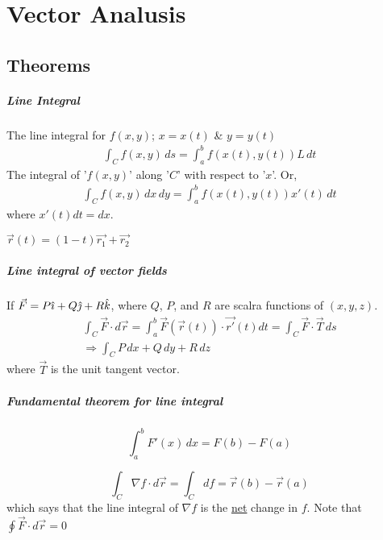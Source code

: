 \chapter{Vector Analusis}
    \section{Theorems}
        \paragraph{Line Integral} The line integral for $f(x, y)$; $x=x(t)$ \& $y=y(t)$
            \begin{align*}
                \int_C f(x, y)\, ds = \int_a^b f(x(t), y(t))L\, dt
            \end{align*}
            The integral of '$f(x, y)$' along '$C$' with respect to '$x$'. Or,
            \begin{align*}
                \int_C f(x, y)\, dx\, dy = \int_a^b f(x(t), y(t)) x'(t)\, dt
            \end{align*}
            where $x'(t) dt = dx$.

        \starpar $\vec{r}(t) = (1-t)\vec{r_1} + \vec{r_2}$

        \paragraph{Line integral of vector fields}
            If $\vec{F} = P\hat{\imath} + Q\hat{\jmath} + R\hat{k}$, where $Q$, $P$, and $R$ are scalra functions of $(x, y, z)$.
            \begin{align*}
                \int_C \vec{F} \cdot d\vec{r} = \int_a^b \vec{F}(\vec{r}(t)) \cdot \vec{r'}(t) dt = \int_C \vec{F} \cdot \vec{T}\, ds\\
                \Rightarrow \int_C P\, dx + Q\, dy + R\, dz
            \end{align*}
            where $\vec{T}$ is the unit tangent vector. 

        \paragraph{Fundamental theorem for line integral}
            \[ \int_a^b F'(x)\, dx = F(b) - F(a) \]
            
            \[
                \int_C \nabla{f} \cdot d\vec{r} = \int_C df = \vec{r}(b) - \vec{r}(a)
            \]
            which says that the line integral of $\nabla{f}$ is the \underline{net} change in $f$.
            Note that $\oint \vec{F} \cdot d\vec{r} = 0$

